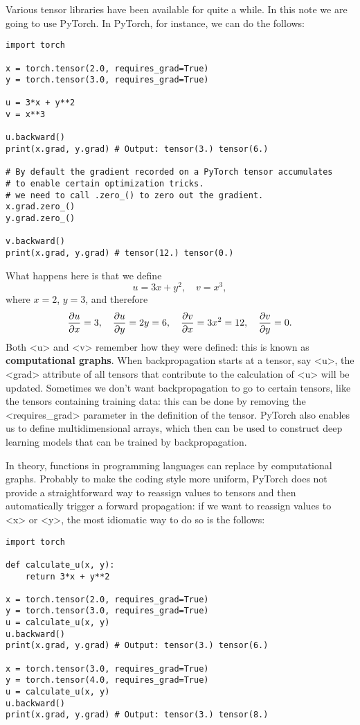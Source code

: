 \documentclass[hyperref, a4paper, 12pt]{report}
\newcommand*{\concept}[1]{{\textbf{#1}}}
\def\texttt#1{<#1>}%
\newcommand{\shortcode}[1]{\texttt{#1}}
\begin{document}
Various tensor libraries have been available for quite a while.
In this note we are going to use PyTorch.
In PyTorch, for instance, we can do the follows:

\begin{lstlisting}
import torch

x = torch.tensor(2.0, requires_grad=True)
y = torch.tensor(3.0, requires_grad=True)

u = 3*x + y**2
v = x**3

u.backward()
print(x.grad, y.grad) # Output: tensor(3.) tensor(6.)

# By default the gradient recorded on a PyTorch tensor accumulates
# to enable certain optimization tricks.
# we need to call .zero_() to zero out the gradient. 
x.grad.zero_()
y.grad.zero_()

v.backward()
print(x.grad, y.grad) # tensor(12.) tensor(0.)

\end{lstlisting}

What happens here is that we define 
\[
    u = 3x + y^2, \quad v = x^3,
\]
where $x = 2$, $y = 3$, and therefore 
\[
    \pdv{u}{x} = 3, \quad \pdv{u}{y} = 2y = 6, \quad \pdv{v}{x} = 3x^2 = 12, \quad \pdv{v}{y} = 0.
\]
Both \shortcode{u} and \shortcode{v} remember how they were defined:
this is known as \concept{computational graphs}.
When backpropagation starts at a tensor, say \shortcode{u},
the \shortcode{grad} attribute of all tensors that contribute to the calculation of \shortcode{u}
will be updated.
Sometimes we don't want backpropagation to go to certain tensors,
like the tensors containing training data:
this can be done by removing the \shortcode{requires_grad} parameter in the definition of the tensor.
PyTorch also enables us to define multidimensional arrays,
which then can be used to construct deep learning models that can be trained by backpropagation.

In theory, functions in programming languages can replace by computational graphs.
Probably to make the coding style more uniform,
PyTorch does not provide a straightforward way to reassign values to tensors
and then automatically trigger a forward propagation:
if we want to reassign values to \shortcode{x} or \shortcode{y},
the most idiomatic way to do so is the follows:

\begin{lstlisting}
import torch 

def calculate_u(x, y):
    return 3*x + y**2

x = torch.tensor(2.0, requires_grad=True)
y = torch.tensor(3.0, requires_grad=True)
u = calculate_u(x, y)
u.backward()
print(x.grad, y.grad) # Output: tensor(3.) tensor(6.)

x = torch.tensor(3.0, requires_grad=True)
y = torch.tensor(4.0, requires_grad=True)
u = calculate_u(x, y)
u.backward()
print(x.grad, y.grad) # Output: tensor(3.) tensor(8.)
\end{lstlisting}
\end{document}
